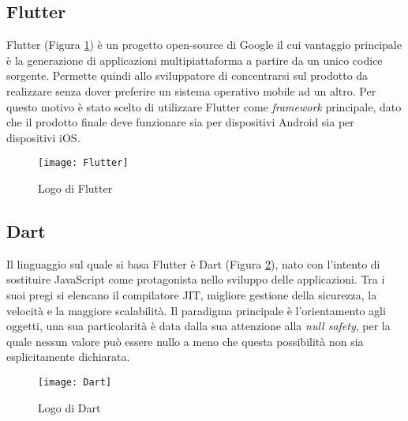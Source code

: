 \subsection{Flutter}
Flutter (Figura \ref{fig:flutter}) è un progetto open-source di Google il cui vantaggio principale è la generazione di applicazioni multipiattaforma a partire da un unico codice sorgente.\newline
Permette quindi allo sviluppatore di concentrarsi sul prodotto da realizzare senza dover preferire un sistema operativo mobile ad un altro.\newline
Per questo motivo è stato scelto di utilizzare Flutter come \emph{framework} principale, dato che il prodotto finale deve funzionare sia per dispositivi Android sia per dispositivi iOS.\newline
\begin{figure}[!h] 
    \centering
    \texttt{[image: Flutter]} 
    \caption{Logo di Flutter}\label{fig:flutter}
\end{figure}

\subsection{Dart}
Il linguaggio sul quale si basa Flutter è Dart (Figura \ref{fig:dart}), nato con l’intento di sostituire JavaScript come protagonista nello sviluppo delle applicazioni.\newline
Tra i suoi pregi si elencano il compilatore JIT, migliore gestione della sicurezza, la velocità e la maggiore scalabilità.\newline
Il paradigma principale è l’orientamento agli oggetti, una sua particolarità è data dalla sua attenzione alla \emph{null safety}, per la quale nessun valore può essere nullo a meno che questa possibilità non sia esplicitamente dichiarata.\newline
\begin{figure}[!h] 
    \centering 
    \texttt{[image: Dart]} 
    \caption{Logo di Dart}\label{fig:dart}
\end{figure}

